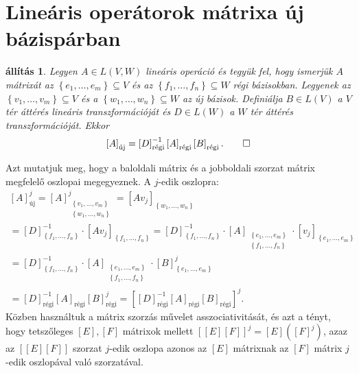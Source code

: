 \documentclass[9pt, a4paper, showtrims]{memoir}
\makeatletter
\renewenvironment{proof}[1][\proofname]
    {\par\pushQED{\qed}%
    \normalfont \topsep6\p@\@plus6\p@\relax
    \trivlist
    \item[\hskip\labelsep
        \itshape
    #1\@addpunct{:}]\ignorespaces}
    {\popQED\endtrivlist\@endpefalse}
\theoremstyle{plain}
\newtheorem{proposition}{állítás}[chapter]
\theoremstyle{remark}
\theoremstyle{definition}
\newcommand{\uj}{\text{új}}
\newcommand{\rgi}{\text{régi}}
\makeatother
\begin{document}
\section{Lineáris operátorok mátrixa új bázispárban}
\begin{proposition}
	Legyen $A\in L\left( V,W \right)$ lineáris operáció
	és tegyük fel, hogy ismerjük $A$ mátrixát az
	$\left\{ e_1,\ldots,e_m \right\}\subseteq V$ és az
	$\left\{ f_1,\ldots,f_n \right\}\subseteq W$ régi bázisokban.
	Legyenek az $\left\{ v_1,\ldots,v_m \right\}\subseteq V$
	és a $\left\{ w_1,\ldots,w_n \right\}\subseteq W$ az új bázisok.
	Definiálja $B\in L\left( V \right)$ a $V$ tér áttérés lineáris transzformációját
	és $D\in L\left( W \right)$ a $W$ tér áttérés transzformációját.
	Ekkor
	\[
		\left[ A \right]_{\uj}=
		\left[ D \right]_{\rgi}^{-1}\left[ A \right]_{\rgi}\left[ B \right]_{\rgi}.\qedhere
	\]
\end{proposition}
\begin{proof}
	Azt mutatjuk meg, hogy a baloldali mátrix és a jobboldali szorzat mátrix megfelelő oszlopai megegyeznek.
	A $j$-edik oszlopra:
	\begin{multline*}
		\left[ A \right]_{\uj}^j
		=
		\left[ A \right]_{\substack{\left\{ v_1,\ldots,v_m \right\}\\ \left\{ w_1,\ldots,w_n \right\}}}^j
		=
		\left[ Av_j \right]_{\left\{ w_1,\ldots,w_n \right\}}
		\\
		=
		\left[ D \right]^{-1}_{\left\{ f_1,\ldots,f_n \right\}}\cdot
		\left[ Av_j \right]_{\left\{ f_1,\ldots,f_n \right\}}
		=
		\left[ D \right]^{-1}_{\left\{ f_1,\ldots,f_n \right\}}\cdot
		\left[ A \right]_{\substack{\left\{ e_1,\ldots,e_m \right\}\\ \left\{ f_1,\ldots,f_n \right\}}}
		\cdot
		\left[ v_j \right]_{\left\{ e_1,\ldots,e_m \right\}}
		\\
		=
		\left[ D \right]^{-1}_{\left\{ f_1,\ldots,f_n \right\}}\cdot
		\left[ A \right]_{\substack{\left\{ e_1,\ldots,e_m \right\}\\ \left\{ f_1,\ldots,f_n \right\}}}
		\cdot
		\left[ B \right]_{\left\{ e_1,\ldots,e_m \right\}}^j
		\\
		=
		\left[ D \right]_\rgi^{-1}
		\left[ A \right]_\rgi
		\left[ B \right]_\rgi^j
		=
        \left[ \left[ D \right]^{-1}_\rgi\left[ A \right]_\rgi\left[ B \right]_\rgi \right]^j.
	\end{multline*}
	Közben használtuk a mátrix szorzás művelet asszociativitását,
	és azt a tényt,
	hogy tetszőleges $\left[ E \right],\left[ F \right]$ mátrixok mellett
    $\left[ \left[ E \right]\left[ F \right] \right]^j=\left[ E \right]\left( \left[F  \right]^j \right)$, azaz
    az $\left[ \left[ E \right]\left[ F \right] \right]$ szorzat $j$-edik oszlopa azonos az $\left[ E \right]$ mátrixnak az $\left[ F \right]$ mátrix $j$-edik oszlopával való szorzatával.
\end{proof}
\end{document}
